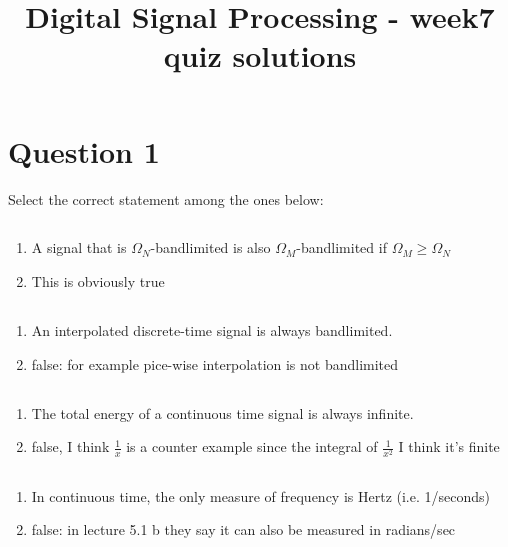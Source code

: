 \documentclass[a4paper]{article}
\title{Digital Signal Processing - week7 quiz solutions}
\begin{document}
\maketitle

\section{Question 1}
Select the correct statement among the ones below:

\subsection{} 
\begin{enumerate}
\item A signal that is $\Omega_N$-bandlimited is also $\Omega_M$-bandlimited if $\Omega_M \ge \Omega_N$
\item This is obviously true
\end{enumerate}

\subsection{}
\begin{enumerate}
\item An interpolated discrete-time signal is always bandlimited.
\item false: for example pice-wise interpolation is not bandlimited 
\end{enumerate}

\subsection{}
\begin{enumerate}
\item The total energy of a continuous time signal is always infinite.
\item false, I think $\frac{1}{x}$ is a counter example since the integral of $\frac{1}{x^2}$ I think it's finite
\end{enumerate}

\subsection{}
\begin{enumerate}
\item In continuous time, the only measure of frequency is Hertz (i.e. 1/seconds)
\item false: in lecture 5.1 b they say it can also be measured in radians/sec
\end{enumerate}
\end{document}
